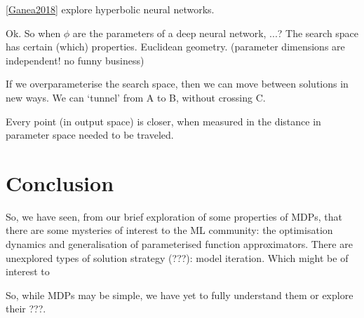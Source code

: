 \ref{Ganea2018} explore hyperbolic neural networks.

Ok. So when $\phi$ are the parameters of a deep neural network, ...? The search space has certain (which) properties.
Euclidean geometry.
(parameter dimensions are independent! no funny business)

If we overparameterise the search space, then we can move between solutions in new ways. We can `tunnel' from A to B, without crossing C.

Every point (in output space) is closer, when measured in the distance in parameter space needed to be traveled.

\section{Conclusion}

So, we have seen, from our brief exploration of some properties of MDPs, that
there are some mysteries of interest to the ML community: the optimisation dynamics and generalisation of
parameterised function approximators.
There are unexplored types of solution strategy (???): model iteration. Which might be of interest to

So, while MDPs may be simple, we have yet to fully understand them or explore their ???.
